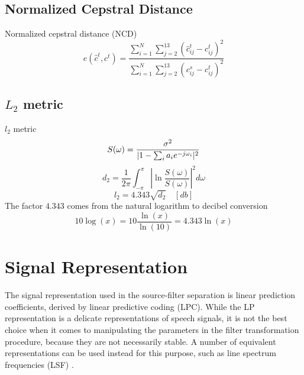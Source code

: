 \subsection{Normalized Cepstral Distance} %
\label{sub:normalized_cepstral_distance}
\begin{definition}
	Normalized cepstral distance (NCD)
\begin{equation}
	e(\hat{c}^t,c^t) = \frac{\sum_{i=1}^{N}\sum_{j=2}^{13}(\hat{c}_{ij}^t-c_{ij}^t)^2}{\sum_{i=1}^{N}\sum_{j=2}^{13}(c_{ij}^s-c_{ij}^t)^2}
\end{equation}
\end{definition}

\subsection{$L_2$ metric} %
\label{sub:l_metric}
$l_2$ metric \cite{gray76}
\begin{equation}
	S(\omega) = \frac{\sigma^2}{\lvert1-\sum_{i}a_i e^{-j\omega_i}\rvert^2}
\end{equation}
\begin{equation}
	d_2 = \frac{1}{2\pi}\int_{-\pi}^{\pi}\left\lvert\ln \frac{S(\omega)}{S(\omega)}\right\rvert^2 d\omega
\end{equation}
\begin{equation}
	l_2  = 4.343 \sqrt{d_2} \quad [db]
\end{equation}
The factor $4.343$ comes from the natural logarithm to decibel conversion
\begin{equation}
	10\log(x) = 10 \frac{\ln(x)}{\ln(10)} = 4.343\ln(x) 
\end{equation}

\section{Signal Representation} %
\label{the:signal_representation}
The signal representation used in the source-filter separation is linear prediction coefficients, derived by linear predictive coding (LPC). While the LP representation is a delicate representations of speech signals, it is not the best choice when it comes to manipulating the parameters in the filter transformation procedure, because they are not necessarily stable. A number of equivalent representations can be used instead for this purpose, such as line spectrum frequencies (LSF) \cite{taletek}.

